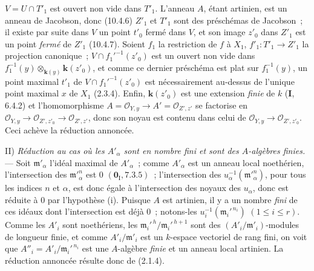 $V=U\cap T'_1$ est ouvert non vide dans $T'_1$. L'anneau $A$, étant artinien,
est un anneau de Jacobson, donc (10.4.6) $Z'_1$ et $T'_1$ sont des préschémas de
Jacobson~; il existe par suite dans $V$ un point $t'_0$ fermé dans $V$, et son
image $z'_0$ dans $Z'_1$ est un point \emph{fermé} de $Z'_1$ (10.4.7). Soient $f_1$ la
restriction de $f$ à $X_1$, $f'_1:T'_1\to Z'_1$ la projection canonique~;
$V\cap f_1'^{-1}(z'_0)$ est un ouvert non vide dans
$f_1^{-1}(y)\otimes_{\mathbf{k}(y)}\boldsymbol{k}(z'_0)$, et comme ce dernier préschéma est plat sur
$f_1^{-1}(y)$, un point maximal $t'_1$ de $V\cap f_1'^{-1}(z'_0)$ est
nécessairement au-dessus de l'unique point maximal $x$ de $X_1$ (2.3.4).
Enfin, $\boldsymbol{k}(z'_0)$ est une extension \emph{finie} de $k$ (\textbf I, 6.4.2) et
l'homomorphisme $A=\mathcal O_{Y,y}\to A'=\mathcal O_{Z',z'}$ se factorise en
$\mathcal O_{Y,y}\to\mathcal O_{Z',z'_0}\to\mathcal O_{Z',z'}$, donc son noyau
est contenu dans celui de $\mathcal O_{Y,y}\to\mathcal O_{Z',z'_0}$. Ceci
achève la réduction annoncée.

\medskip
\noindent II) \emph{Réduction au cas où les $A'_\alpha$ sont en nombre
fini et sont des $A$-algèbres finies.} --- Soit $\mathfrak m'_\alpha$ l'idéal
maximal de $A'_\alpha$~; comme $A'_\alpha$ est un anneau local noethérien,
l'intersection des $\mathfrak m'^n_\alpha$ est $0$ $(\mathbf 0_{\mathrm I},7.3.5)$~;
l'intersection des $u_\alpha^{-1}(\mathfrak m'^n_\alpha)$, pour tous les indices
$n$ et $\alpha$, est donc égale à l'intersection des noyaux des $u_\alpha$, donc
est réduite à $0$ par l'hypothèse (i). Puisque $A$ est artinien, il y a un nombre
\emph{fini} de ces idéaux dont l'intersection est déjà $0$~; notons-les
$u_i^{-1}(\mathfrak m_i'^{\,n_i})$ $(1\leq i\leq r)$. Comme les $A'_i$ sont
noethériens, les $\mathfrak m_i'^{\,h}/\mathfrak m_i'^{\,h+1}$ sont des
$(A'_i/\mathfrak m'_i)$-modules de longueur finie, et comme
$A'_i/\mathfrak m'_i$ est un $k$-espace vectoriel de rang fini, on voit que
$A''_i=A'_i/\mathfrak m_i'^{\,n_i}$ est une $A$-algèbre \emph{finie} et un anneau local
artinien. La réduction annoncée résulte donc de (2.1.4).

